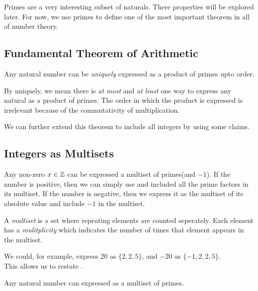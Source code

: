 Primes are a very interesting subset of naturals. There properties will be explored later. For now, we use primes to define one of the most important theorem in all of number theory.

\subsection{Fundamental Theorem of Arithmetic}

\begin{theorem}
	\label{thm: fta}
	Any natural number can be \textit{uniquely} expressed as a product of primes upto order.
\end{theorem}

By uniquely, we mean there is \textit{at most} and \textit{at least} one way to express any natural as a product of primes. The order in which the product is expressed is irrelevant because of the commutativity of multiplication. \par 
We can further extend this theorem to include all integers by using some claims.

\subsection{Integers as Multisets}

\begin{claim}
	Any non-zero \(x \in \mathbb Z\) can be expressed a multiset of primes(and \(-1\)). If the number is positive, then we can simply use  and included all the prime factors in its multiset. If the number is negative, then we express it as the multiset of its absolute value and include \(-1\) in the multiset.
\end{claim}

\begin{remark}
	A \textit{multiset} is a set where repeating elements are counted seperately. Each element has a \textit{mulitplicity} which indicates the number of times that element appears in the multiset.
\end{remark}

We could, for example, express \(20\) as \(\{2, 2, 5\}\), and \(-20\) as \(\{-1, 2, 2, 5\}\).
\\
This allows us to restate .

\begin{theorem}
	Any natural number can expressed as a multiset of primes.
\end{theorem}

